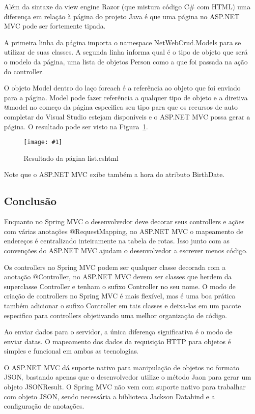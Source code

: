 \documentclass[a4paper,12pt]{article}
\newcommand{\figura}[3] {
	\begin{figure}[ht]
		\centering
		\texttt{[image: \#1]}
		\caption{#2}
		\label{#3}
	\end{figure}
	\FloatBarrier
}
\newcommand{\sharpcode}[3] {
	
	\FloatBarrier
}
\begin{document}
\sharpcode{code/21.txt}{Código fonte da página list.cshtml}{lst:21}

Além da sintaxe da view engine Razor (que mistura código C\# com HTML) uma diferença em relação à página do projeto Java é que uma página no ASP.NET MVC pode ser fortemente tipada.

A primeira linha da página importa o namespace NetWebCrud.Models para se utilizar de suas classes. A segunda linha informa qual é o tipo de objeto que será o modelo da página, uma lista de objetos Person como a que foi passada na ação do controller.

O objeto Model dentro do laço foreach é a referência ao objeto que foi enviado para a página. Model pode fazer referência a qualquer tipo de objeto e a diretiva @model no começo da página especifica seu tipo para que os recursos de auto completar do Visual Studio estejam disponíveis e o ASP.NET MVC possa gerar a página. O resultado pode ser visto na Figura~\ref{fig:35}.

\figura{35.png}{Resultado da página list.cshtml}{fig:35}

Note que o ASP.NET MVC exibe também a hora do atributo BirthDate.

\subsection{Conclusão}

Enquanto no Spring MVC o desenvolvedor deve decorar seus controllers e ações com várias anotações @RequestMapping, no ASP.NET MVC o mapeamento de endereços é centralizado inteiramente na tabela de rotas. Isso junto com as convenções do ASP.NET MVC ajudam o desenvolvedor a escrever menos código.

Os controllers no Spring MVC podem ser qualquer classe decorada com a anotação @Controller, no ASP.NET MVC devem ser classes que herdem da superclasse Controller e tenham o sufixo Controller no seu nome. O modo de criação de controllers no Spring MVC é mais flexível, mas é uma boa prática também adicionar o sufixo Controller em tais classes e deixa-las em um pacote especifico para controllers objetivando uma melhor organização de código.

Ao enviar dados para o servidor, a única diferença significativa é o modo de enviar datas. O mapeamento dos dados da requisição HTTP para objetos é simples e funcional em ambas as tecnologias.

O ASP.NET MVC dá suporte nativo para manipulação de objetos no formato JSON, bastando apenas que o desenvolvedor utilize o método Jaon para gerar um objeto JSONResult. O Spring MVC não vem com suporte nativo para trabalhar com objeto JSON, sendo necessária a biblioteca Jackson Databind e a configuração de anotações.
\end{document}

